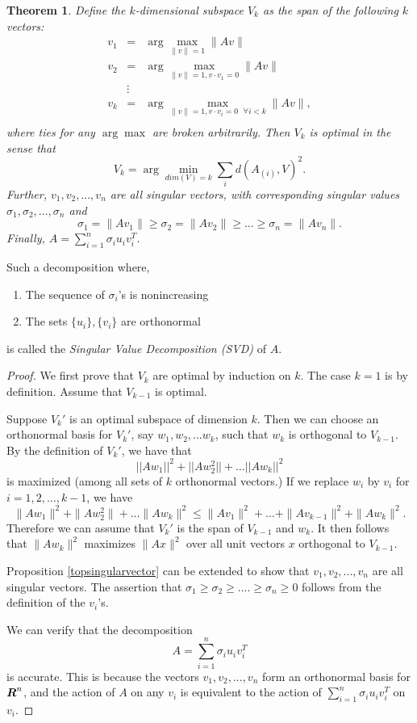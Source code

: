 \documentclass{book}
\newtheorem{theorem}{Theorem}[chapter]
\numberwithin{exercise}{chapter}
\begin{document}
\begin{theorem}\label{thm:SVD}
Define the $k$-dimensional subspace $V_k$ as the span of the following $k$ vectors:
\begin{eqnarray*}
v_1 &=& \arg\max_{\|v\| = 1} \|Av\| \\
v_2 &=& \arg\max_{\|v\| = 1, v\cdot v_1 = 0} \|Av\| \\
&\vdots&\\
v_k &=& \arg\max_{\|v\| = 1, v\cdot v_i = 0 \mbox{ }\forall i < k} \|Av\|,  \\
\end{eqnarray*}
where ties for any $\arg\max$ are broken arbitrarily.
Then $V_k$ is \emph{optimal} in the sense that
\[
V_k = \arg\min_{dim(V) = k}\sum_i d(A_{(i)},V)^2.
\]
Further, $v_1,v_2,...,v_n$ are all singular vectors, with corresponding
singular values $\sigma_1,\sigma_2,...,\sigma_n$ and
\[
\sigma_1 = \|Av_1\| \ge \sigma_2=\|Av_2\| \ge ... \ge \sigma_n = \|Av_n\|.
\]
Finally, $A =\sum_{i=1}^n \sigma_i u_i v_i^T$.
\end{theorem}

Such a decomposition where,
\begin{enumerate}
\item The sequence of $\sigma_i$'s is nonincreasing
\item The sets $\{u_i\},\{v_i\}$ are orthonormal
\end{enumerate}
is called the \emph{Singular Value Decomposition (SVD)} of $A$.

\begin{proof}
We first prove that $V_k$ are optimal by induction on $k$. The case $k=1$ is by definition. Assume that $V_{k-1}$ is optimal.

Suppose $V_k'$ is an optimal subspace of dimension $k$. Then we can
choose an orthonormal basis for $V_k'$, say  $w_1,w_2,\ldots w_k$, such
that $w_k$ is orthogonal to $V_{k-1}$. By the definition of
$V_k'$, we have that
$$||Aw_1||^2+||Aw_2^2||+\ldots ||Aw_k||^2$$
is maximized (among all sets of $k$ orthonormal vectors.) If
we replace $w_i$ by $v_i$ for $i=1,2,\ldots,k-1$, we have
\[
\|Aw_1\|^2+\|Aw_2^2\|+\ldots \|Aw_k\|^2 \le \|Av_1\|^2+\ldots+\|Av_{k-1}\|^2 + \|Aw_k\|^2.
 \]
Therefore we can assume that $V_k'$ is the span of $V_{k-1}$ and $w_k$. It then follows that $\|Aw_k\|^2$ maximizes $\|Ax\|^2$ over all unit vectors $x$ orthogonal to $V_{k-1}$.

Proposition \ref{topsingularvector}
can be extended to show that $v_1,v_2,...,v_n$
are all singular vectors.  The assertion that $\sigma_1 \ge \sigma_2
\ge .... \ge \sigma_n \ge 0$ follows from the definition of the
$v_i$'s.

We can verify that the decomposition
\[
A = \sum_{i=1}^n\sigma_i u_i v_i^T
\]
is accurate.  This is because the
vectors $v_1,v_2,...,v_n$ form an orthonormal basis for $\mbox{\mbox{\boldmath $R$}}^n$, and
the action of $A$ on any $v_i$ is equivalent to the action of
$\sum_{i=1}^n \sigma_i u_i v_i^T$ on $v_i$.
\end{proof}
\end{document}
